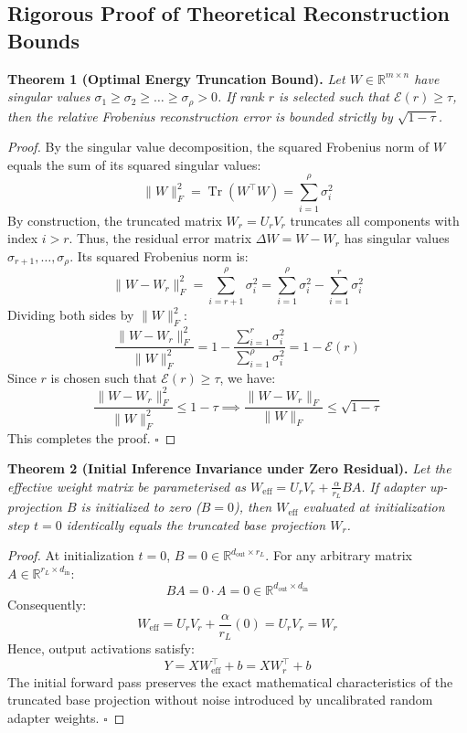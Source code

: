 \documentclass{article}
\begin{document}
\subsection{Rigorous Proof of Theoretical Reconstruction Bounds}

\textbf{Theorem 1 (Optimal Energy Truncation Bound).} \textit{Let $W \in \mathbb{R}^{m \times n}$ have singular values $\sigma_1 \ge \sigma_2 \ge \dots \ge \sigma_{\rho} > 0$. If rank $r$ is selected such that $\mathcal{E}(r) \ge \tau$, then the relative Frobenius reconstruction error is bounded strictly by $\sqrt{1 - \tau}$.}

\begin{proof}
By the singular value decomposition, the squared Frobenius norm of $W$ equals the sum of its squared singular values:
\[
\|W\|_F^2 = \operatorname{Tr}(W^\top W) = \sum_{i=1}^{\rho} \sigma_i^2
\]
By construction, the truncated matrix $W_r = U_r V_r$ truncates all components with index $i > r$. Thus, the residual error matrix $\Delta W = W - W_r$ has singular values $\sigma_{r+1}, \dots, \sigma_{\rho}$.
Its squared Frobenius norm is:
\[
\|W - W_r\|_F^2 = \sum_{i=r+1}^{\rho} \sigma_i^2 = \sum_{i=1}^{\rho} \sigma_i^2 - \sum_{i=1}^{r} \sigma_i^2
\]
Dividing both sides by $\|W\|_F^2$:
\[
\frac{\|W - W_r\|_F^2}{\|W\|_F^2} = 1 - \frac{\sum_{i=1}^{r} \sigma_i^2}{\sum_{i=1}^{\rho} \sigma_i^2} = 1 - \mathcal{E}(r)
\]
Since $r$ is chosen such that $\mathcal{E}(r) \ge \tau$, we have:
\[
\frac{\|W - W_r\|_F^2}{\|W\|_F^2} \le 1 - \tau \implies \frac{\|W - W_r\|_F}{\|W\|_F} \le \sqrt{1 - \tau}
\]
This completes the proof. $\square$
\end{proof}

\textbf{Theorem 2 (Initial Inference Invariance under Zero Residual).} \textit{Let the effective weight matrix be parameterised as $W_{\text{eff}} = U_r V_r + \frac{\alpha}{r_L} B A$. If adapter up-projection $B$ is initialized to zero ($B = 0$), then $W_{\text{eff}}$ evaluated at initialization step $t=0$ identically equals the truncated base projection $W_r$.}

\begin{proof}
At initialization $t=0$, $B = 0 \in \mathbb{R}^{d_{\text{out}} \times r_L}$. For any arbitrary matrix $A \in \mathbb{R}^{r_L \times d_{\text{in}}}$:
\[
B A = 0 \cdot A = 0 \in \mathbb{R}^{d_{\text{out}} \times d_{\text{in}}}
\]
Consequently:
\[
W_{\text{eff}} = U_r V_r + \frac{\alpha}{r_L} (0) = U_r V_r = W_r
\]
Hence, output activations satisfy:
\[
Y = X W_{\text{eff}}^\top + b = X W_r^\top + b
\]
The initial forward pass preserves the exact mathematical characteristics of the truncated base projection without noise introduced by uncalibrated random adapter weights. $\square$
\end{proof}
\end{document}
